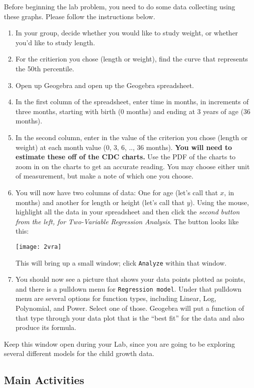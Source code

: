 \documentclass[11pt,letterpaper]{article}
\begin{document}
Before beginning the lab problem, you need to do some data collecting using these graphs. Please follow the instructions below. 

\begin{enumerate}
	\item In your group, decide whether you would like to study weight, or whether you'd like to study length. 
	\item For the critierion you chose (length or weight), find the curve that represents the 50th percentile. 
	\item Open up Geogebra and open up the Geogebra spreadsheet. 
	\item In the first column of the spreadsheet, enter time in months, in increments of three months, starting with birth (0 months) and ending at 3 years of age (36 months). 
	\item In the second column, enter in the value of the criterion you chose (length or weight) at each month value (0, 3, 6, .., 36 months). \textbf{You will need to estimate these off of the CDC charts.} Use the PDF of the charts to zoom in on the charts to get an accurate reading. You may choose either unit of measurement, but make a note of which one you choose. 
	\item You will now have two columns of data: One for age (let's call that $x$, in months) and another for length or height (let's call that $y$). Using the mouse, highlight all the data in your spreadsheet and then click the \emph{second button from the left, for Two-Variable Regression Analysis}. The button looks like this: 
	\begin{center}
		\texttt{[image: 2vra]}
	\end{center}
	This will bring up a small window; click \texttt{Analyze} within that window. 
	\item You should now see a picture that shows your data points plotted as points, and there is a pulldown menu for \texttt{Regression model}. Under that pulldown menu are several options for function types, including Linear, Log, Polynomial, and Power. Select one of those. Geogebra will put a function of that type through your data plot that is the ``best fit'' for the data and also produce its formula. 
\end{enumerate}

Keep this window open during your Lab, since you are going to be exploring several different models for the child growth data. 


\subsection*{Main Activities}
\end{document}
